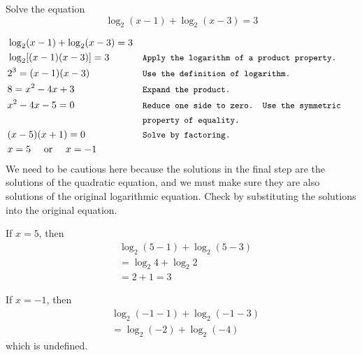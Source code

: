 \begin{example} Solve the equation
    \begin{equation*}
\log _2(x-1)+\log _2(x-3)=3
\end{equation*}

\begin{solution}

\begin{align*}
& \log _2(x-1)+\log _2(x-3)=3  \\
& \log _2[(x-1)(x-3)]=3 && \texttt{\small Apply the logarithm of a product property.} \\
& 2^3=(x-1)(x-3) && \texttt{\small Use the definition of logarithm.} \\
& 8=x^2-4 x+3 && \texttt{\small Expand the product.}\\
& x^2-4 x-5=0 && \texttt{\small Reduce one side to zero. Use the symmetric }\\
&\vspace{-0.2cm}   && \texttt{\small property of equality.} \\
& (x-5)(x+1)=0 && \texttt{\small Solve by factoring.} \\
& x=5 \quad \text{ or } \quad x=-1
\end{align*}
We need to be cautious here because the solutions in the final step are the solutions of the quadratic equation, and we must make sure they are also solutions of the original logarithmic equation. Check by substituting the solutions into the original equation.

\begin{minipage}[t]{0.45\textwidth}
If $x=5$, then
\[
\begin{aligned}
& \log _2(5-1)+\log _2(5-3) \\
& =\log _2 4+\log _2 2 \\
& =2+1=3
\end{aligned}
\]
\end{minipage}%
\hfill
\begin{minipage}[t]{0.45\textwidth}
If $x=-1$, then
\[
\begin{aligned}
& \log _2(-1-1)+\log _2(-1-3) \\
& =\log _2(-2)+\log _2(-4)
\end{aligned}
\]
which is undefined.
\end{minipage}

\end{solution}

\end{example}

